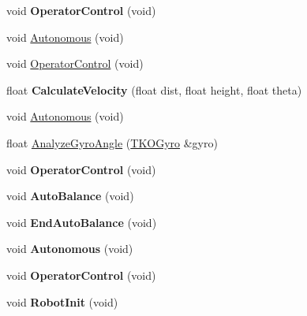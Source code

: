 \begin{DoxyCompactItemize}
\item 
\hypertarget{class_robot_demo_aea3d3a6789fa41653464bddc48d6a2c1}{void {\bfseries Operator\-Control} (void)}\label{class_robot_demo_aea3d3a6789fa41653464bddc48d6a2c1}

\item 
void \hyperlink{class_robot_demo_a80f9c6496e671ca2145d7f5543985e9a}{Autonomous} (void)
\item 
void \hyperlink{class_robot_demo_aea3d3a6789fa41653464bddc48d6a2c1}{Operator\-Control} (void)
\item 
\hypertarget{class_robot_demo_a159d7d19b1eb3c1489561d101f209112}{float {\bfseries Calculate\-Velocity} (float dist, float height, float theta)}\label{class_robot_demo_a159d7d19b1eb3c1489561d101f209112}

\item 
void \hyperlink{class_robot_demo_a80f9c6496e671ca2145d7f5543985e9a}{Autonomous} (void)
\item 
float \hyperlink{class_robot_demo_af24ec862633fd0927a00d492c32f2cf5}{Analyze\-Gyro\-Angle} (\hyperlink{class_t_k_o_gyro}{T\-K\-O\-Gyro} \&gyro)
\item 
\hypertarget{class_robot_demo_aea3d3a6789fa41653464bddc48d6a2c1}{void {\bfseries Operator\-Control} (void)}\label{class_robot_demo_aea3d3a6789fa41653464bddc48d6a2c1}

\item 
\hypertarget{class_robot_demo_ae8affaa7a9f2b4b4952187282ab3ff60}{void {\bfseries Auto\-Balance} (void)}\label{class_robot_demo_ae8affaa7a9f2b4b4952187282ab3ff60}

\item 
\hypertarget{class_robot_demo_a6d678cd2412907db5c2b62c57257b229}{void {\bfseries End\-Auto\-Balance} (void)}\label{class_robot_demo_a6d678cd2412907db5c2b62c57257b229}

\item 
\hypertarget{class_robot_demo_a80f9c6496e671ca2145d7f5543985e9a}{void {\bfseries Autonomous} (void)}\label{class_robot_demo_a80f9c6496e671ca2145d7f5543985e9a}

\item 
\hypertarget{class_robot_demo_aea3d3a6789fa41653464bddc48d6a2c1}{void {\bfseries Operator\-Control} (void)}\label{class_robot_demo_aea3d3a6789fa41653464bddc48d6a2c1}

\item 
\hypertarget{class_robot_demo_a97242890ba9107422e5af04bcb96cdff}{void {\bfseries Robot\-Init} (void)}\label{class_robot_demo_a97242890ba9107422e5af04bcb96cdff}


\end{DoxyCompactItemize}
